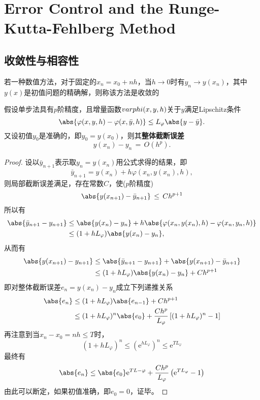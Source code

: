 \section{Error Control and the Runge-Kutta-Fehlberg Method}
\subsection{收敛性与相容性}
\begin{defn}[收敛]
若一种数值方法，对于固定的$x_n=x_0+nh$，当$h\rightarrow 0$时有$y_n\rightarrow y(x_n)$，其中$y(x)$是初值问题的精确解，则称该方法是收敛的
\end{defn}
\begin{theo}[整体截断误差]
假设单步法具有$p$阶精度，且增量函数$\\varphi(x,y,h)$关于$y$满足Lipschitz条件
\[
\abs{\varphi(x,y,h)-\varphi(x,\bar{y},h)}\leq L_\varphi\abs{y-\bar{y}}.
\]
又设初值$y_0$是准确的，即$y_0=y(x_0)$，则其\textbf{整体截断误差}
\[
y(x_n)-y_n\,=\,O(h^p).
\]
\end{theo}
\begin{proof}
设以$\bar{y}_{n+1}$表示取$y_n=y(x_n)$用公式求得的结果，即
\[
\bar{y}_{n+1}=y(x_n)+h\varphi(x_n,y(x_n),h),
\]
则局部截断误差满足，存在常数$C$，使($p$阶精度)
\[
\abs{y(x_{n+1})-\bar{y}_{n+1}}\,\leq\,Ch^{p+1}
\]
所以有
\begin{align*}
    \abs{\bar{y}_{n+1}-y_{n+1}} &\leq \abs{y(x_n)-y_n}+h\abs{\varphi(x_n,y(x_n),h)-\varphi(x_n,y_n,h)} \\
    &\leq (1+hL_\varphi)\abs{y(x_n)-y_n},
\end{align*}
从而有
\begin{align*}
    \abs{y(x_{n+1})-y_{n+1}} &\leq \abs{\bar{y}_{n+1}-y_{n+1}}+\abs{y(x_{n+1})-\bar{y}_{n+1}} \\
    &\leq (1+hL_\varphi)\abs{y(x_n)-y_n} + Ch^{p+1}
\end{align*}
即对整体截断误差$e_n=y(x_n)-y_n$成立下列递推关系
\begin{align*}
    \abs{e_n} &\leq (1+hL_\varphi)\abs{e_{n-1}}+Ch^{p+1} \\
    &\leq (1+hL_\varphi)^n\abs{e_0}+\frac{Ch^p}{L_\varphi}\left[(1+hL_\varphi)^n-1\right]
\end{align*}
再注意到当$x_n-x_0=nh\leq T$时，
\[
(1+hL_\varphi)^n \leq (\mathrm{e}^{hL_\varphi})^n \leq \mathrm{e}^{TL_\varphi}
\]
最终有
\[
\abs{e_n}\leq \abs{e_0}\mathrm{e}^{TL-\varphi}+\frac{Ch^p}{L_\varphi}\left(\mathrm{e}^{TL_\varphi}-1\right)
\]
由此可以断定，如果初值准确，即$e_0=0$，证毕。
\end{proof}
